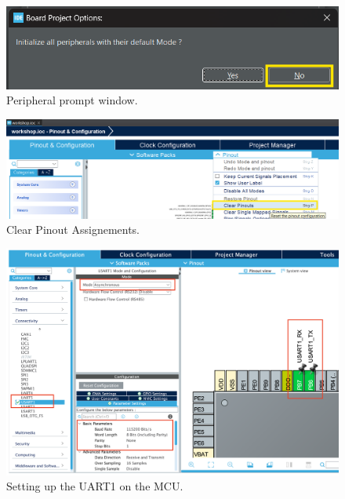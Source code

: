 \documentclass[parskip=half,notes,cadrem,toolver]{iisvlsi}
\begin{document}
\begin{figure}[H]
    \begin{center}
        \includegraphics[width=0.5\linewidth]{new_figures/peripherals.png}
        \caption{Peripheral prompt window.}
        \label{fig:periph}
    \end{center}
\end{figure}

\begin{figure}[H]
    \begin{center}
        \includegraphics[width=\linewidth]{new_figures/pinouts.png}
        \caption{Clear Pinout Assignements.}
        \label{fig:pinout}
    \end{center}
\end{figure}

\begin{figure}[H]
    \begin{center}
        \includegraphics[width=0.9\linewidth]{new_figures/UART.png}
        \caption{Setting up the UART1 on the MCU.}
        \label{fig:UART}
    \end{center}
\end{figure}
\end{document}
